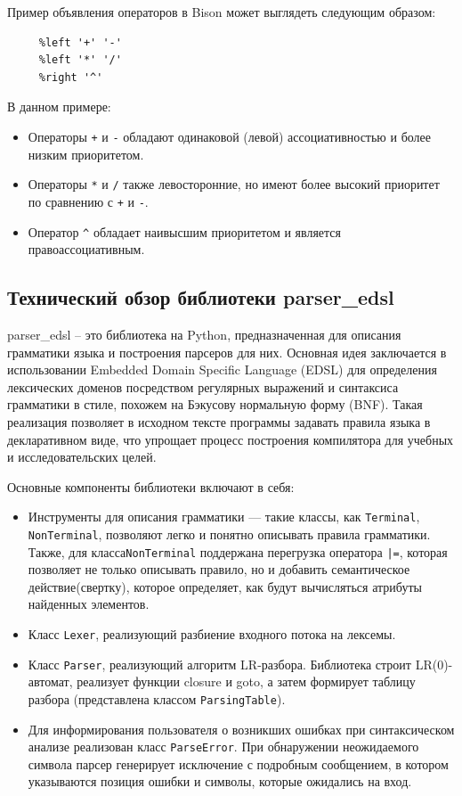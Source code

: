 \documentclass[14pt, russian]{scrartcl}
\begin{document}
Пример объявления операторов в Bison может выглядеть следующим образом:

\begin{verbatim}
	 %left '+' '-'
	 %left '*' '/'
	 %right '^'
\end{verbatim}

В данном примере:
\begin{itemize}
	\item Операторы \verb|+| и \verb|-| обладают одинаковой (левой)
	ассоциативностью и более низким приоритетом.
	\item Операторы \verb|*| и \verb|/| также левосторонние,
	но имеют более высокий приоритет по сравнению с \verb|+| и \verb|-|.
	\item Оператор \verb|^| обладает
	наивысшим приоритетом и является правоассоциативным.
\end{itemize}

\subsection{Технический обзор библиотеки parser\_edsl}

parser\_edsl\cite{parsedsl} – это библиотека на Python\cite{Python}, предназначенная для описания грамматики языка и построения парсеров для них.
 Основная идея заключается в использовании Embedded Domain Specific Language (EDSL)
для определения лексических доменов посредством регулярных выражений и синтаксиса грамматики в стиле, похожем
на Бэкусову нормальную форму (BNF). Такая реализация позволяет в исходном тексте программы задавать правила
языка в декларативном виде, что упрощает процесс построения компилятора для учебных и исследовательских целей.

Основные компоненты библиотеки включают в себя:

\begin{itemize}
	\item Инструменты для описания грамматики --- такие классы, как \texttt{Terminal}, \texttt{NonTerminal}, позволяют легко и понятно описывать правила грамматики.
		Также, для класса\texttt{NonTerminal} поддержана перегрузка оператора \texttt{|=}, которая позволяет не только описывать
		правило, но и добавить семантическое действие(свертку), которое определяет, как будут
		вычисляться атрибуты найденных элементов.
	\item Класс \texttt{Lexer}, реализующий разбиение входного потока на лексемы.
	\item Класс \texttt{Parser}, реализующий алгоритм LR-разбора.  Библиотека строит LR(0)-автомат, реализует
	функции closure и goto, а затем формирует таблицу разбора (представлена классом \texttt{ParsingTable}).
	\item Для информирования пользователя о возникших ошибках при синтаксическом анализе реализован класс \texttt{ParseError}.
	 При обнаружении неожидаемого символа парсер генерирует исключение с подробным сообщением, в
	 котором указываются позиция ошибки и символы, которые ожидались на вход.
\end{itemize}
\end{document}
